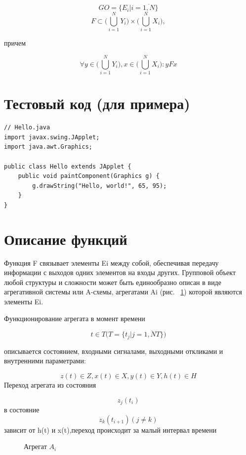 \documentclass[12pt]{article}
\begin{document}
\[
GO = \{ E_{i}|i = \overline{1,N}\}
\]
\[
F \subset  \Bigg( \bigcup_{i=1}^{N}Y_{i}       \Bigg)  \times \Bigg( \bigcup_{i=1}^{N}X_{i}  \Bigg), 
\]

причем

\[
\forall y  \in  \Bigg( \bigcup_{i=1}^{N}Y_{i}       \Bigg), x \in  \Bigg( \bigcup_{i=1}^{N}X_{i} \Bigg): yFx
\]

\section{Тестовый код (для примера)}

\begin{lstlisting}
// Hello.java
import javax.swing.JApplet;
import java.awt.Graphics;

public class Hello extends JApplet {
    public void paintComponent(Graphics g) {
        g.drawString("Hello, world!", 65, 95);
    }    
}
\end{lstlisting}
\section{Описание функций}
Функция F связывает элементы Ei
 между собой, обеспечивая передачу информации с выходов одних элементов на входы других.
Групповой объект любой структуры и сложности может быть единообразно описан в виде агрегативной системы или A-схемы, агрегатами Ai
 (рис. ~\ref{7}) которой являются элементы Ei.

Функционирование агрегата в момент времени 

\[
t \in T  \Bigg( T = \{t_{j} |j= \overline{1,NT} \}  \Bigg)
\]

описывается состоянием, входными
сигналами, выходными откликами и внутренними параметрами: 

\[
z(t) \in Z, x(t) \in X, y(t) \in Y, h(t) \in H
\]
Переход агрегата из состояния

\[
z_{j}(t_{i})
\]
в состояние
\[
z_{k}(t_{i+1}) (j \neq k) 
\]
зависит  от h(t) и x(t),переход происходит за малый интервал времени

\begin{figure}
\caption{Агрегат ${A_i}$}
\label{7}
\end{figure}
\end{document}

